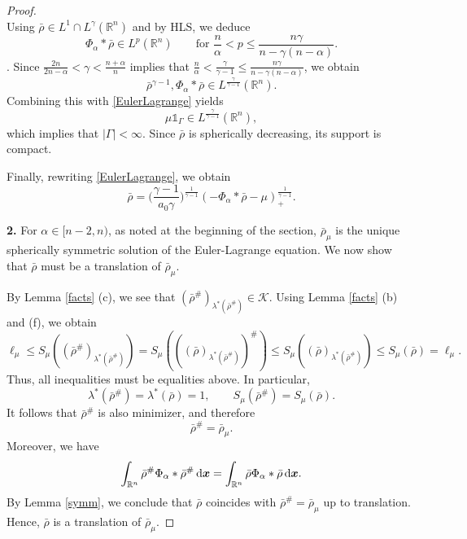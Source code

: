 \documentclass[reqno,11pt]{amsart}
\numberwithin{equation}{section}
\theoremstyle{definition}
\def\dd{{\, \rm d}}
\begin{document}
\begin{proof}
\begin{equation}
\end{equation}
Using $\bar{\rho} \in L^1 \cap L^\gamma (\mathbb{R}^n)$ and by HLS, 
we deduce  
$$
\Phi_\alpha * \bar{\rho} \in L^p(\mathbb{R}^n)
\qquad\mbox{for $\frac{n}{\alpha} < p 
\leq \frac{n\gamma}{n - \gamma (n - \alpha)}$}.
$$. 
Since $\frac{2n}{2n - \alpha} < \gamma < \frac{n + \alpha}{n}$
implies that 
$\frac{n}{\alpha} < \frac{\gamma}{\gamma - 1} \leq \frac{n\gamma}{n - \gamma (n - \alpha)}$,
we obtain
$$
\bar{\rho}^{\gamma - 1}, \Phi_\alpha * \bar{\rho} \in L^\frac{\gamma}{\gamma - 1}(\mathbb{R}^n).
$$ 
Combining this with \eqref{EulerLagrange} yields 
$$
\mu \mathds{1}_{\Gamma} \in L^\frac{\gamma}{\gamma - 1}(\mathbb{R}^n),
$$
which implies that $|\Gamma| < \infty$. 
Since $\bar{\rho}$ is spherically decreasing, its support is compact. 

Finally, rewriting \eqref{EulerLagrange}, we obtain
    \[
    \bar{\rho} = \Big ( \frac{\gamma - 1}{a_0 \gamma} \Big )^\frac{1}{\gamma - 1} (- \Phi_\alpha * \bar{\rho} - \mu)_+^\frac{1}{\gamma - 1}.
    \]

   \medskip
   \noindent
   {\bf 2.}
    For $\alpha \in [n-2,n)$, as noted at the beginning of the section, 
    $\bar{\rho}_\mu$ is the unique spherically symmetric solution 
    of the Euler-Lagrange equation. 
    We now show that $\bar{\rho}$ must be a translation of $\bar{\rho}_\mu$.
    
    By Lemma \ref{facts} (c), we see that $(\bar{\rho}^\#)_{\lambda^*(\bar{\rho}^\#)} \in \mathcal{K}$. 
    Using Lemma \ref{facts} (b) and (f), we obtain
    \[
    \ell_\mu \leq S_\mu ((\bar{\rho}^\#)_{\lambda^*(\bar{\rho}^\#)} ) 
    = S_\mu (((\bar{\rho})_{\lambda^*(\bar{\rho}^\#)})^\#)
    \leq S_\mu( (\bar{\rho})_{\lambda^*(\bar{\rho}^\#)}) 
    \leq S_\mu ( \bar{\rho} ) = \ell_\mu.
    \]
    Thus, all inequalities must be equalities above.
    In particular,
    $$
    \lambda^*(\bar{\rho}^\#) = \lambda^*(\bar{\rho}) = 1,
    \qquad 
    S_\mu(\bar{\rho}^\#) = S_\mu(\bar{\rho}).
    $$
    It follows that $\bar{\rho}^\#$ is also minimizer, and therefore
    $$
   \bar{\rho}^\# = \bar{\rho}_\mu.
   $$ 
    Moreover, we have
    \[
    \int_{\mathbb{R}^n} \bar{\rho}^\# \Phi_\alpha * \bar{\rho}^\# \dd \boldsymbol{x} = \int_{\mathbb{R}^n} \bar{\rho} \Phi_\alpha * \bar{\rho} \dd \boldsymbol{x}.
    \]
    By Lemma \ref{symm}, we conclude 
    that $\bar{\rho}$ coincides with $\bar{\rho}^\# = \bar{\rho}_\mu$ up to translation.
    Hence, $\bar{\rho}$ is a translation of  $\bar{\rho}_\mu$. 
\end{proof}
\setcounter{step}{0}
\end{document}
